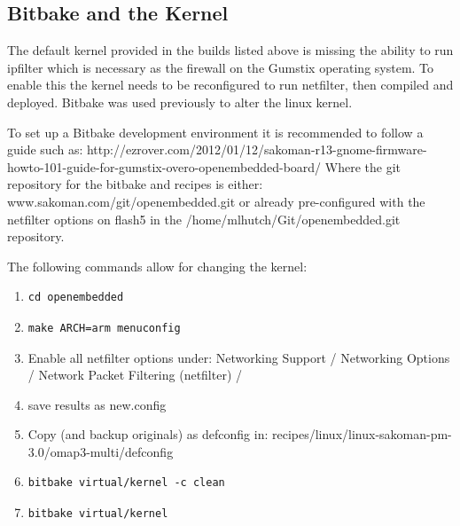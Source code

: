 \subsection{Bitbake and the Kernel}

The default kernel provided in the builds listed above is missing the ability to run ipfilter which is necessary as the firewall on the Gumstix operating system.
To enable this the kernel needs to be reconfigured to run netfilter, then compiled and deployed.
Bitbake was used previously to alter the linux kernel.

To set up a Bitbake development environment it is recommended to follow a guide such as:
http://ezrover.com/2012/01/12/sakoman-r13-gnome-firmware-howto-101-guide-for-gumstix-overo-openembedded-board/
Where the git repository for the bitbake and recipes is either:
www.sakoman.com/git/openembedded.git
or already pre-configured with the netfilter options on flash5 in the /home/mlhutch/Git/openembedded.git repository.

The following commands allow for changing the kernel:

\begin{enumerate}

\item \begin{verbatim}cd openembedded \end{verbatim}
\item \begin{verbatim}make ARCH=arm menuconfig \end{verbatim}

\item Enable all netfilter options under: Networking Support / Networking Options / Network Packet Filtering (netfilter) /

\item save results as new.config
\item Copy (and backup originals) as defconfig in: recipes/linux/linux-sakoman-pm-3.0/omap3-multi/defconfig

\item \begin{verbatim}bitbake virtual/kernel -c clean \end{verbatim}
\item \begin{verbatim}bitbake virtual/kernel \end{verbatim}

\end{enumerate}

